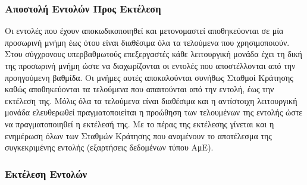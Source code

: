 \subsubsection*{Αποστολή Εντολών Προς Εκτέλεση}
\label{chap2_InstructionIssue}

Οι εντολές που έχουν αποκωδικοποιηθεί και μετονομαστεί αποθηκεύονται σε μία προσωρινή μνήμη έως ότου είναι διαθέσιμα όλα τα τελούμενα που χρησιμοποιούν. Στου σύγχρονους υπερβαθμωτούς επεξεργαστές κάθε λειτουργική μονάδα έχει τη δική της προσωρινή μνήμη ώστε να διαχωρίζονται οι εντολές που αποστέλλονται από την προηγούμενη βαθμίδα. Οι μνήμες αυτές αποκαλούνται συνήθως Σταθμοί Κράτησης καθώς αποθηκεύονται τα τελούμενα που απαιτούνται από την εντολή, έως την εκτέλεση της. Μόλις όλα τα τελούμενα είναι διαθέσιμα και η αντίστοιχη λειτουργική μονάδα ελευθερωθεί πραγματοποιείται η προώθηση των τελουμένων της εντολής ώστε να πραγματοποιηθεί η εκτέλεσή της. Με το πέρας της εκτέλεσης γίνεται και η ενημέρωση όλων των Σταθμών Κράτησης που αναμένουν το αποτέλεσμα της συγκεκριμένης εντολής (εξαρτήσεις δεδομένων τύπου ΑμΕ).

\subsubsection*{Εκτέλεση Εντολών}
\label{chap2_InstructionExcecution}

